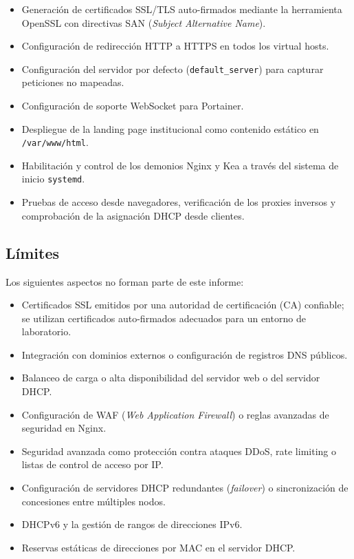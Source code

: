 \begin{itemize}
\begin{itemize}
        \end{itemize}
  \item Generación de certificados SSL/TLS auto-firmados mediante la herramienta
        OpenSSL con directivas SAN (\textit{Subject Alternative Name}).
  \item Configuración de redirección HTTP a HTTPS en todos los virtual hosts.
  \item Configuración del servidor por defecto (\texttt{default\_server}) para
        capturar peticiones no mapeadas.
  \item Configuración de soporte WebSocket para Portainer.
  \item Despliegue de la landing page institucional como contenido estático en
        \texttt{/var/www/html}.
  \item Habilitación y control de los demonios Nginx y Kea a través del
        sistema de inicio \texttt{systemd}.
  \item Pruebas de acceso desde navegadores, verificación de los proxies
        inversos y comprobación de la asignación DHCP desde clientes.
\end{itemize}

\subsection{Límites}

Los siguientes aspectos no forman parte de este informe:

\begin{itemize}
  \item Certificados SSL emitidos por una autoridad de certificación (CA)
        confiable; se utilizan certificados auto-firmados adecuados para
        un entorno de laboratorio.
  \item Integración con dominios externos o configuración de registros DNS
        públicos.
  \item Balanceo de carga o alta disponibilidad del servidor web o del
        servidor DHCP.
  \item Configuración de WAF (\textit{Web Application Firewall}) o reglas
        avanzadas de seguridad en Nginx.
  \item Seguridad avanzada como protección contra ataques DDoS, rate limiting
        o listas de control de acceso por IP.
  \item Configuración de servidores DHCP redundantes (\textit{failover}) o
        sincronización de concesiones entre múltiples nodos.
  \item DHCPv6 y la gestión de rangos de direcciones IPv6.
  \item Reservas estáticas de direcciones por MAC en el servidor DHCP.
\end{itemize}

